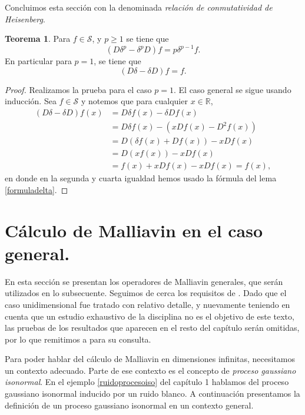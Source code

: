 \documentclass[letterpaper,twoside,12pt]{book}
\newcommand{\R}{\mathbb{R}}
\renewcommand{\S}{\mathcal{S}}
\newcommand{\1}{\mathds{1}}
\theoremstyle{definition}
\theoremstyle{definition}
\newtheorem{teo}{Teorema}
\theoremstyle{remark}
\theoremstyle{definition}
\theoremstyle{definition}
\theoremstyle{definition}
\theoremstyle{definition}
\theoremstyle{definition}
\begin{document}
Concluimos esta sección con la denominada \textit{relación de conmutatividad de Heisenberg}.
\begin{teo} 
 Para $f\in \S$, y $p\geq1$ se tiene que 
 \[
    (D\delta^p-\delta^p D)f=p\delta^{p-1}f.
 \]
 En particular para $p=1$, se tiene que
 \[
 (D\delta-\delta D)f=f.
 \]
 \end{teo}
\begin{proof} 
   Realizamos la prueba para el caso $p=1$. El caso general se sigue usando inducción. Sea $f\in \S$ y notemos que para cualquier $x\in \R$, 
\begin{align*}
   (D\delta-\delta D)f(x)&=D\delta f(x) - \delta D f(x)\\
   &=D \delta f(x) - (xDf(x)-D^2f(x))\\
   &=D \left(\delta f(x)+Df(x)\right) -xDf(x)\\
   &=D \left(xf(x)\right)-xDf(x)\\
   &=f(x)+xDf(x)-xDf(x)=f(x),
\end{align*}
en donde en la segunda y cuarta igualdad hemos usado la fórmula del lema \ref{formuladelta}.
 \end{proof}
\section{Cálculo de Malliavin en el caso general.}

En esta sección se presentan los operadores de Malliavin generales, que serán utilizados en lo subsecuente. Seguimos de cerca los requisitos de \cite[sección 2.1]{KUZGUN202268}. Dado que el caso unidimensional fue tratado con relativo detalle, y nuevamente teniendo en cuenta que un estudio exhaustivo de la disciplina no es el objetivo de este texto, las pruebas de los resultados que aparecen en el resto del capítulo serán omitidas, por lo que remitimos a \cite[capítulo 2]{Nourdin_Peccati_2012} para su consulta.

Para poder hablar del cálculo de Malliavin en dimensiones infinitas, necesitamos un contexto adecuado. Parte de ese contexto es el concepto de \textit{proceso gaussiano isonormal}. En el ejemplo \ref{ruidoprocesoiso} del capítulo 1 hablamos del proceso gaussiano isonormal inducido por un ruido blanco. A continuación presentamos la definición de un proceso gaussiano isonormal en un contexto general.
\end{document}

